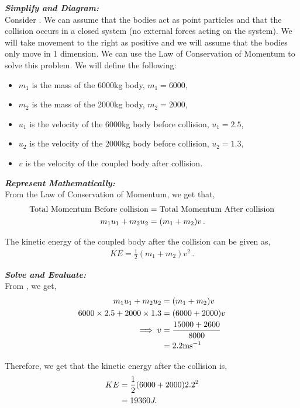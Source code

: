 \begin{subquestions}
\begin{subsubquestions}
\textbf{\textit{Simplify and Diagram:}} \\ 
Consider . We can assume that the bodies act as point particles and that the collision occurs in a closed system (no external forces acting on the system). We will take movement to the right as positive and we will assume that the bodies only move in 1 dimension. We can use the Law of Conservation of Momentum to solve this problem.
We will define the following:
\begin{itemize}
	\item $m_1$ is the mass of the 6000kg body, $m_1=6000$,
	\item $m_2$ is the mass of the 2000kg body, $m_2=2000$,
	\item $u_1$ is the velocity of the 6000kg body before collision, $u_1=2.5$,
	\item $u_2$ is the velocity of the 2000kg body before collision, $u_2=1.3$,
	\item $v$ is the velocity of the coupled body after collision.	
\end{itemize}



\textbf{\textit{Represent Mathematically:}} \\
From the Law of Conservation of Momentum, we get that,
\begin{align}
	\text{Total Momentum Before collision} & = \text{Total Momentum After collision} \nonumber \\
	m_1u_1 + m_2u_2 & = (m_1+m_2)v \,. \label{2008J:q5:VEqn1}
\end{align}

The kinetic energy of the coupled body after the collision can be given as,
\begin{align}
	KE = \frac{1}{2}(m_1+m_2)v^2 \,.
\end{align}


\textbf{\textit{Solve and Evaluate:}} \\
From , we get,
\begin{align}
	m_1u_1 + m_2u_2 & = (m_1+m_2)v \nonumber \\
	6000\times2.5 + 2000\times1.3 & = (6000+2000)v \nonumber \\
	\implies v & = \frac{15000+2600}{8000} \nonumber \\
	& = 2.2\text{ms}^{-1}
\end{align}

Therefore, we get that the kinetic energy after the collision is,
\begin{align}
	KE & = \frac{1}{2}(6000+2000)2.2^2 \nonumber \\
	   & = 19360J.
\end{align} 


\end{subsubquestions}
\end{subquestions}
